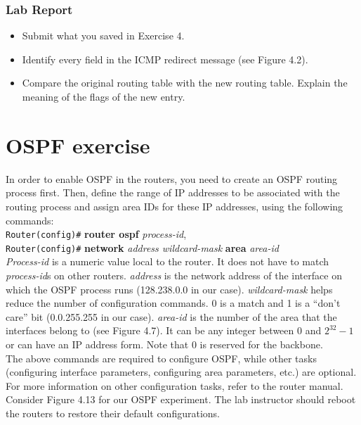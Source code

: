 \documentclass[10pt,a4paper]{article}
\numberwithin{equation}{section}
\numberwithin{figure}{section}
\numberwithin{table}{section}
\begin{document}
    \subsubsection*{Lab Report}
    \begin{itemize}
        \setlength{\itemindent}{0pt}
        \item Submit what you saved in Exercise 4.
        \item Identify every field in the ICMP redirect message (see Figure 4.2).
        \item Compare the original routing table with the new routing table. Explain the meaning of the flags of the new entry.
    \end{itemize}


    \section*{OSPF exercise}
    In order to enable OSPF in the routers, you need to create an OSPF routing process first.
    Then, define the range of IP addresses to be associated with the routing process and assign area IDs for these IP addresses, using the following commands: \\
    \texttt{Router(config)\#} \textbf{router ospf} \textit{process-id}, \\
    \texttt{Router(config)\#} \textbf{network} \textit{address wildcard-mask} \textbf{area} \textit{area-id} \\
    \textit{Process-id} is a numeric value local to the router.
    It does not have to match \textit{process-id}s on other routers.
    \textit{address} is the network address of the interface on which the OSPF process runs (128.238.0.0 in our case).
    \textit{wildcard-mask} helps reduce the number of configuration commands.
    0 is a match and 1 is a “don’t care” bit (0.0.255.255 in our case).
    \textit{area-id} is the number of the area that the interfaces belong to (see Figure 4.7).
    It can be any integer between 0 and $2^{32} - 1$ or can have an IP address form.
    Note that 0 is reserved for the backbone. \\
    The above commands are required to configure OSPF, while other tasks (configuring interface parameters, configuring area parameters, etc.) are optional.
    For more information on other configuration tasks, refer to the router manual. \\
    Consider Figure 4.13 for our OSPF experiment.
    The lab instructor should reboot the routers to restore their default configurations.
\end{document}
